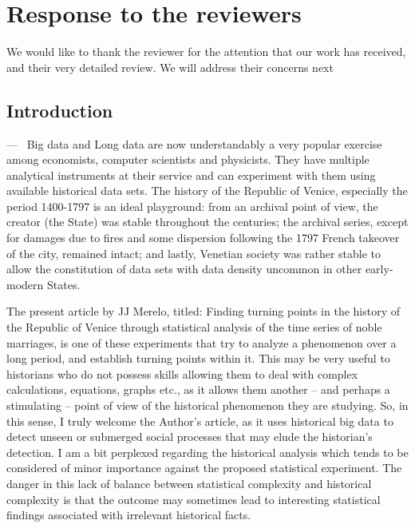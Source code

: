 \documentclass[11pt]{article}
\newcounter{reviewer}
\newcounter{point}[reviewer]
\renewcommand{\thepoint}{P\,\thereviewer.\arabic{point}}
\newenvironment{point}
   {\refstepcounter{point} \bigskip \noindent {\textbf{Reviewer~Point~\thepoint} } ---\ }
   {\par }
\begin{document}
\section*{Response to the reviewers}

We would like to thank the reviewer for the attention that our work has
received, and their very detailed review. We will address their concerns next


\subsection{Introduction}

\begin{point}
  Big data and Long data are now understandably a very popular exercise among economists, computer scientists and physicists. They have multiple analytical instruments at their service and can experiment with them using available historical data sets. The history of the Republic of Venice, especially the period 1400-1797 is an ideal playground: from an archival point of view, the creator (the State) was stable throughout the centuries; the archival series, except for damages due to fires and some dispersion following the 1797 French takeover of the city, remained intact; and lastly, Venetian society was rather stable to allow the constitution of data sets with data density uncommon in other early-modern States.

The present article by JJ Merelo, titled: Finding turning points in the history
of the Republic of Venice through statistical analysis of the time series of
noble marriages, is one of these experiments that try to analyze a phenomenon
over a long period, and establish turning points within it. This may be very
useful to historians who do not possess skills allowing them to deal with
complex calculations, equations, graphs etc., as it allows them another – and
perhaps a stimulating – point of view of the historical phenomenon they are
studying.  So, in this sense, I truly welcome the Author’s article, as it uses
historical big data to detect unseen or submerged social processes that may
elude the historian’s detection. I am a bit perplexed regarding the historical
analysis which tends to be considered of minor importance against the proposed
statistical experiment. The danger in this lack of balance between statistical
complexity and historical complexity is that the outcome may sometimes lead to
interesting statistical findings associated with irrelevant historical facts.
\end{point}
\end{document}
